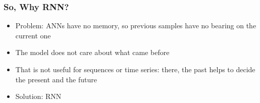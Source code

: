 
\begin{frame}[fragile] \frametitle{So, Why RNN?}

\begin{itemize}
\item Problem: ANNs have no memory, so previous samples have no bearing on the current one
\item The model does not care about what came before
\item That is not useful for sequences or time series: there, the past helps to decide the present and the future
\item Solution: RNN
\end{itemize}


\end{frame}


% 
% 
% 
% 

